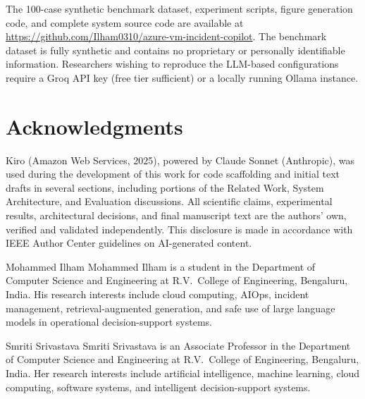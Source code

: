 \documentclass[a4paper,10pt,journal,compsoc]{IEEEtran}
\begin{document}
The 100-case synthetic benchmark dataset, experiment scripts,
figure generation code, and complete system source code are
available at \url{https://github.com/Ilham0310/azure-vm-incident-copilot}.
The benchmark dataset is fully synthetic and contains no proprietary
or personally identifiable information. Researchers wishing to
reproduce the LLM-based configurations require a Groq API key (free
tier sufficient) or a locally running Ollama instance.

\section*{Acknowledgments}

Kiro (Amazon Web Services, 2025), powered by Claude Sonnet
(Anthropic), was used during the development of this work for code
scaffolding and initial text drafts in several sections, including
portions of the Related Work, System Architecture, and Evaluation
discussions. All scientific claims, experimental results, architectural
decisions, and final manuscript text are the authors' own, verified
and validated independently. This disclosure is made in accordance with
IEEE Author Center guidelines on AI-generated content.




\begin{IEEEbiography}{Mohammed Ilham}
  Mohammed Ilham is a student in the Department of Computer Science and
  Engineering at R.V.\ College of Engineering, Bengaluru, India. His
  research interests include cloud computing, AIOps, incident
  management, retrieval-augmented generation, and safe use of large
  language models in operational decision-support systems.
\end{IEEEbiography}

\begin{IEEEbiography}{Smriti Srivastava}
  Smriti Srivastava is an Associate Professor in the Department of
  Computer Science and Engineering at R.V.\ College of Engineering,
  Bengaluru, India. Her research interests include artificial
  intelligence, machine learning, cloud computing, software systems,
  and intelligent decision-support systems.
\end{IEEEbiography}
\end{document}
